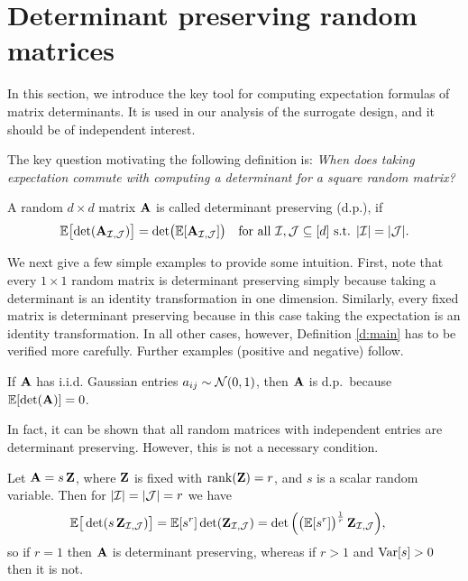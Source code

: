 \documentclass[../../thesis.tex]{subfiles}
\begin{document}
\section{Determinant preserving random matrices}
\label{s:dp}

In this section, we introduce the key tool for computing expectation formulas of matrix determinants.
It is used in our analysis of the surrogate design, and it should be of independent interest.

The key question motivating the following definition is: \textit{When does taking expectation commute with computing a determinant for a square random matrix?}
\begin{definition}\label{d:main}
  A random $d\times d$ matrix $\mathbf A$ is called determinant
  preserving (d.p.), if
  \begin{align*}
    \mathbb E\big[\!\det(\mathbf A_{\mathcal I,\mathcal{J}})\big] =
    \det\!\big(\mathbb E[\mathbf A_{\mathcal I,\mathcal{J}}]\big)\quad \text{for all }\mathcal I,\mathcal{J}\subseteq
    [d]\text{ s.t. }|\mathcal I|=|\mathcal{J}|.
  \end{align*}
\end{definition}

We next give a few simple examples to provide some intuition. First, note
that every $1\times 1$ random matrix is determinant preserving simply
because taking a determinant is an identity transformation in one
dimension. Similarly, every fixed matrix is determinant preserving because
in this case taking the expectation is an identity
transformation. In all other cases, however, Definition \ref{d:main}
has to be verified more carefully. Further examples (positive and
negative) follow.
\begin{example}
  If $\mathbf A$ has i.i.d. Gaussian entries $a_{ij}\sim\mathcal{N}(0,1)$, then
  $\mathbf A$ is d.p.~because $\mathbb E[\det(\mathbf A)]=0$.
\end{example}

In fact, it can be shown that all random matrices with independent entries
are determinant preserving. However, this is not a necessary condition.
\begin{example}\label{e:rank-1}
  Let $\mathbf A = s\,\mathbf Z$, where $\mathbf Z$ is fixed with $\mathrm{rank}(\mathbf Z) = r$, and $s$
  is a scalar random variable. Then for $|\mathcal I|=|\mathcal{J}|=r$ we have
  \begin{align*}
    \mathbb E\big[\det(s\,\mathbf Z_{\mathcal I,\mathcal{J}})\big] & = \mathbb E[s^r]\det(\mathbf Z_{\mathcal I,\mathcal{J}})
    =\det\Big(\big(\mathbb E[s^r]\big)^{\frac1r}\,\mathbf Z_{\mathcal I,\mathcal{J}}\Big),
  \end{align*}
  so if $r=1$ then $\mathbf A$ is determinant preserving, whereas if $r>1$
  and $\mathrm{Var}[s]>0$ then it is not.
\end{example}
\end{document}
